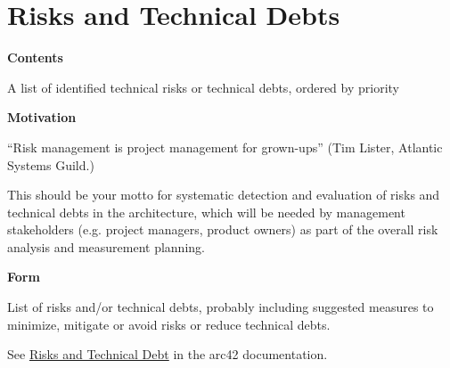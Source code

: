 \hypertarget{section-technical-risks}{%
\section{Risks and Technical Debts}\label{section-technical-risks}}

\textbf{Contents}

A list of identified technical risks or technical debts, ordered by
priority

\textbf{Motivation}

``Risk management is project management for grown-ups'' (Tim Lister,
Atlantic Systems Guild.)

This should be your motto for systematic detection and evaluation of
risks and technical debts in the architecture, which will be needed by
management stakeholders (e.g. project managers, product owners) as part
of the overall risk analysis and measurement planning.

\textbf{Form}

List of risks and/or technical debts, probably including suggested
measures to minimize, mitigate or avoid risks or reduce technical debts.

See \href{https://docs.arc42.org/section-11/}{Risks and Technical Debt}
in the arc42 documentation.
